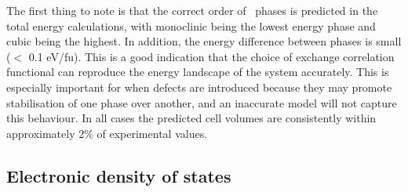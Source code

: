 The first thing to note is that the correct order of \zirconia\ phases is predicted in the total energy calculations, with monoclinic being the lowest energy phase and cubic being the highest. In addition, the energy difference between phases is small ($<$ 0.1 eV/fu). This is a good indication that the choice of exchange correlation functional can reproduce the energy landscape of the system accurately. This is especially important for when defects are introduced because they may promote stabilisation of one phase over another, and an inaccurate model will not capture this behaviour. In all cases the predicted cell volumes are consistently within approximately 2\% of experimental values. 

\begin{table}[ht] %
\onehalfspacing
\centering
\caption[Calculated unit cell parameters for the different crystal structures of \zirconia . Experimental data for pure monoclinic, yttria-stabilised tetragonal and magnesia-stabilised cubic phases at 295 K are shown in parentheses. Energy difference between structures is shown with respect to the cubic phase.]{Calculated unit cell parameters for the different crystal structures of \zirconia . Experimental data for monoclinic, tetragonal and cubic phases at 295 K are shown in parentheses \cite{Howard1988}. Energy difference between structures is shown with respect to the cubic phase.}
\label{lattice_params}
\end{table}

\subsection{Electronic density of states} 

